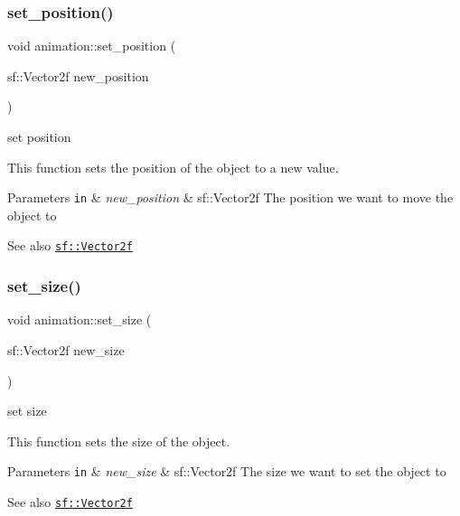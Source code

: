\subsubsection{\texorpdfstring{set\+\_\+position()}{set\_position()}}
{\footnotesize\ttfamily void animation\+::set\+\_\+position (\begin{DoxyParamCaption}\item[{sf\+::\+Vector2f}]{new\+\_\+position }\end{DoxyParamCaption})}



set position 

This function sets the position of the object to a new value.


\begin{DoxyParams}[1]{Parameters}
\mbox{\tt in}  & {\em new\+\_\+position} & sf\+::\+Vector2f The position we want to move the object to \\
\hline
\end{DoxyParams}
\begin{DoxySeeAlso}{See also}
\href{https://www.sfml-dev.org/documentation/2.0/classsf_1_1Vector2.php }{\tt sf\+::\+Vector2f} 
\end{DoxySeeAlso}
\mbox{\label{classanimation_a7c0b874294e81f3612590920fd845602}} 
\subsubsection{\texorpdfstring{set\+\_\+size()}{set\_size()}}
{\footnotesize\ttfamily void animation\+::set\+\_\+size (\begin{DoxyParamCaption}\item[{sf\+::\+Vector2f}]{new\+\_\+size }\end{DoxyParamCaption})}



set size 

This function sets the size of the object.


\begin{DoxyParams}[1]{Parameters}
\mbox{\tt in}  & {\em new\+\_\+size} & sf\+::\+Vector2f The size we want to set the object to \\
\hline
\end{DoxyParams}
\begin{DoxySeeAlso}{See also}
\href{https://www.sfml-dev.org/documentation/2.0/classsf_1_1Vector2.php }{\tt sf\+::\+Vector2f} 
\end{DoxySeeAlso}
\mbox{\label{classanimation_a30e84ff71206b8ec4f82fd70ad776036}} 
